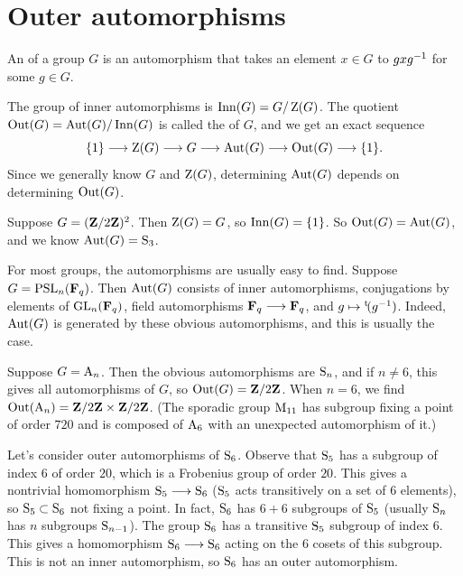 \documentclass[11pt, oneside]{amsart}
\begin{document}
\section{Outer automorphisms}
\begin{definition}
An  of a group $G$ is an automorphism that takes an element $x\in G$ to $gxg^{-1}$ for some $g\in G$.
\end{definition}
The group of inner automorphisms is $\operatorname{Inn}(G) = G / \operatorname{Z}(G)$. The quotient $\operatorname{Out}(G) = \operatorname{Aut}(G)/\operatorname{Inn}(G)$ is called the  of $G$, and we get an exact sequence
$$
\{1\} \longrightarrow \operatorname{Z}(G) \longrightarrow G\longrightarrow \operatorname{Aut}(G) \longrightarrow \operatorname{Out}(G) \longrightarrow \{1\}.
$$
Since we generally know $G$ and $\operatorname{Z}(G)$, determining $\operatorname{Aut}(G)$ depends on determining $\operatorname{Out}(G)$.
\begin{example}
Suppose $G = (\mathbf Z / 2\mathbf Z)^2$. Then $\operatorname{Z}(G) = G$, so $\operatorname{Inn}(G) = \{1\}$. So $\operatorname{Out}(G) = \operatorname{Aut}(G)$, and we know $\operatorname{Aut}(G) = \operatorname{S}_3$.
\end{example}

For most groups, the automorphisms are usually easy to find. Suppose $G = \operatorname{PSL}_n(\mathbf F_q)$. Then $\operatorname{Aut}(G)$ consists of inner automorphisms, conjugations by elements of $\operatorname{GL}_n(\mathbf F_q)$,  field automorphisms $\mathbf F_q\longrightarrow \mathbf F_q$, and $g\mapsto {}^{\mathrm{t}}\!{(g^{-1})}$. Indeed, $\operatorname{Aut}(G)$ is generated by these obvious automorphisms, and this is usually the case.

Suppose $G= \operatorname{A}_n$. Then the obvious automorphisms are $\operatorname{S}_n$, and if $n\ne 6$, this gives all automorphisms of $G$, so $\operatorname{Out}(G) = \mathbf Z / 2\mathbf Z$. When $n=6$, we find $\operatorname{Out}(\operatorname{A}_n) = \mathbf Z / 2\mathbf Z \times \mathbf Z / 2\mathbf Z$. (The sporadic group $\operatorname{M}_{11}$ has subgroup fixing a point of order $720$ and is composed of $\operatorname{A}_6$ with an unexpected automorphism of it.)

Let's consider outer automorphisms of $\operatorname{S}_6$. Observe that $\operatorname{S}_5$ has a subgroup of index $6$ of order $20$, which is a Frobenius group of order $20$. This gives a nontrivial homomorphism $\operatorname{S}_5\longrightarrow \operatorname{S}_6$ ($\operatorname{S}_5$ acts transitively on a set of $6$ elements), so $\operatorname{S}_5\subset \operatorname{S}_6$ not fixing a point. In fact, $\operatorname{S}_6$ has $6+6$ subgroups of $\operatorname{S}_5$ (usually $\operatorname{S}_n$ has $n$ subgroups $\operatorname{S}_{n-1}$). The group $\operatorname{S}_6$ has a transitive $\operatorname{S}_5$ subgroup of index $6$. This gives a homomorphism $\operatorname{S}_6\longrightarrow\operatorname{S}_6$ acting on the $6$ cosets of this subgroup. This is not an inner automorphism, so $\operatorname{S}_6$ has an outer automorphism. 
\end{document}
